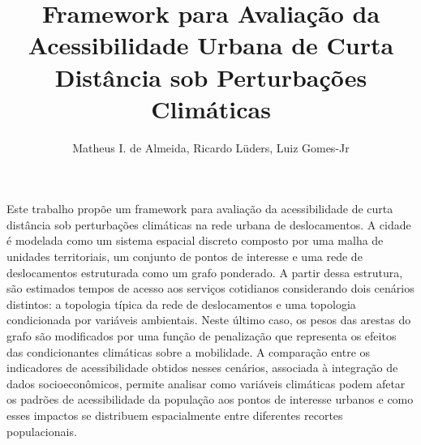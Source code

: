 \documentclass[12pt]{article}
\title{Framework para Avaliação da Acessibilidade Urbana de Curta Distância sob Perturbações Climáticas}
\author{Matheus I. de Almeida\inst{1}, Ricardo Lüders\inst{1}, Luiz Gomes-Jr\inst{1}}
\begin{document}
 

\maketitle

     
\begin{resumo}
Este trabalho propõe um framework para avaliação da acessibilidade de curta distância sob perturbações climáticas na rede urbana de deslocamentos. A cidade é modelada como um sistema espacial discreto composto por uma malha de unidades territoriais, um conjunto de pontos de interesse e uma rede de deslocamentos estruturada como um grafo ponderado. A partir dessa estrutura, são estimados tempos de acesso aos serviços cotidianos considerando dois cenários distintos: a topologia típica da rede de deslocamentos e uma topologia condicionada por variáveis ambientais. Neste último caso, os pesos das arestas do grafo são modificados por uma função de penalização que representa os efeitos das condicionantes climáticas sobre a mobilidade. A comparação entre os indicadores de acessibilidade obtidos nesses cenários, associada à integração de dados socioeconômicos, permite analisar como variáveis climáticas podem afetar os padrões de acessibilidade da população aos pontos de interesse urbanos e como esses impactos se distribuem espacialmente entre diferentes recortes populacionais.
\end{resumo}

% 
% 
% 
% 
% 












\newpage

\end{document}
